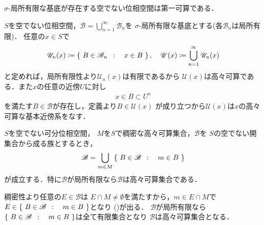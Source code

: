 	\begin{screen}
		\begin{thm}
			$\sigma$-局所有限な基底が存在する空でない位相空間は第一可算である．
		\end{thm}
	\end{screen}
	
	\begin{prf}
		$S$を空でない位相空間，$\mathscr{B} = \bigcup_{n=1}^\infty \mathscr{B}_n$を
		$\sigma$-局所有限な基底とする(各$\mathscr{B}_n$は局所有限)．
		任意の$x \in S$で
		\begin{align}
			\mathscr{U}_n(x) \coloneqq \left\{\ B \in \mathscr{B}_n\ \, : \quad x \in B\ \right\},
			\quad \mathscr{U}(x) \coloneqq \bigcup_{n=1}^\infty \mathscr{U}_n(x)
		\end{align}
		と定めれば，局所有限性より$\mathscr{U}_n(x)$は有限であるから
		$\mathscr{U}(x)$は高々可算である．また$x$の任意の近傍$U$に対し
		\begin{align}
			x \in B \subset U^{\mathrm{o}}
		\end{align}
		を満たす$B \in \mathscr{B}$が存在し，定義より$B \in \mathscr{U}(x)$
		が成り立つから$\mathscr{U}(x)$は$x$の高々可算な基本近傍系をなす．
		\QED
	\end{prf}
	
	\begin{screen}
		\begin{thm}[可分空間の局所有限な開集合族は高々可算集合]
		\label{thm:locally_finite_family_of_open_sets_is_countable_in_separable_space}
			$S$を空でない可分位相空間，
			$M$を$S$で稠密な高々可算集合，$\mathscr{B}$を
			$S$の空でない開集合から成る族とするとき，
			\begin{align}
				\mathscr{B} = \bigcup_{m \in M} \left\{\ B \in \mathscr{B}\ \, : \quad m \in B\ \right\}
				\label{eq:thm_locally_finite_family_of_open_sets_is_countable_in_separable_space}
			\end{align}
			が成立する．特に$\mathscr{B}$が局所有限なら$\mathscr{B}$は高々可算集合である．
		\end{thm}
	\end{screen}
	
	\begin{prf}
		稠密性より任意の$E \in \mathscr{B}$は
		$E \cap M \neq \emptyset$を満たすから，$m \in E \cap M$で$
		E \in \left\{\ B \in \mathscr{B}\ \, : \quad m \in B\ \right\}$となり
		()が出る．
		$\mathscr{B}$が局所有限なら$\left\{\ B \in \mathscr{B}\ \, : \quad m \in B\ \right\}$は全て有限集合となり
		$\mathscr{B}$は高々可算集合となる．
		\QED	
	\end{prf}
	
